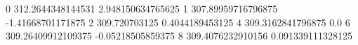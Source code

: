 0 312.2644348144531 2.948150634765625
1 307.89959716796875 -1.41668701171875
2 309.720703125 0.4044189453125
4 309.3162841796875 0.0
6 309.26409912109375 -0.05218505859375
8 309.4076232910156 0.091339111328125
